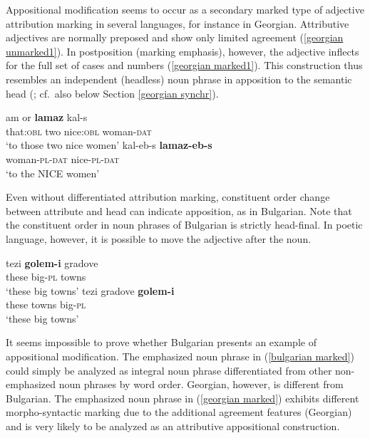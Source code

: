Appositional modification seems to occur as a secondary marked type of adjective attribution marking in several languages, for instance in Georgian. Attributive adjectives are normally preposed and show only limited agreement (\ref{georgian unmarked1}). In postposition (marking emphasis), however, the adjective inflects for the full set of cases and numbers (\ref{georgian marked1}). This construction thus resembles an independent (headless) noun phrase in apposition to the semantic head (\citealt[652, 677]{testelec1998}; cf.~also below Section \ref{georgian synchr}).
\begin{exe}
\begin{xlist}
\ex \label{georgian unmarked1}
\gll	am or \textbf{lamaz} kal-s\\
	that:\textsc{obl} two nice:\textsc{obl} woman-\textsc{dat}\\
\glt	‘to those two nice women’
\ex \label{georgian marked1}
\gll	kal-eb-s \textbf{lamaz-eb-s}\\
	woman-\textsc{pl}-\textsc{dat} nice-\textsc{pl}-\textsc{dat}\\
\glt	‘to the NICE women’
\end{xlist}
\end{exe}
Even without differentiated attribution marking, constituent order change between attribute and head can indicate apposition, as in Bulgarian. Note that the constituent order in noun phrases of Bulgarian is strictly head-final. In poetic language, however, it is possible to move the adjective after the noun.
\begin{exe}
\begin{xlist}
\ex 	
\gll	tezi \textbf{golem-i} gradove\\
	these big-\textsc{pl} towns\\
\glt	‘these big towns’
\ex	\label{bulgarian marked}
\gll	tezi gradove \textbf{golem-i}\\
	these towns big-\textsc{pl}\\
\glt	‘these big towns’
\end{xlist}
\end{exe}
It seems impossible to prove whether Bulgarian presents an example of appositional modification. The emphasized noun phrase in (\ref{bulgarian marked}) could simply be analyzed as integral noun phrase differentiated from other non-emphasized noun phrases by word order. Georgian, however, is different from Bulgarian. The emphasized noun phrase in (\ref{georgian marked}) exhibits different morpho-syntactic marking due to the additional agreement features (Georgian) and is very likely to be analyzed as an attributive appositional construction. 

